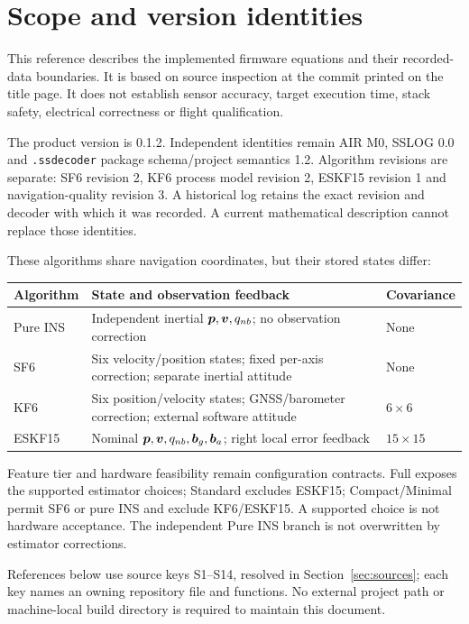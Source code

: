 \section{Scope and version identities}
This reference describes the implemented firmware equations and their recorded-data boundaries. It is based on source inspection at the commit printed on the title page. It does not establish sensor accuracy, target execution time, stack safety, electrical correctness or flight qualification.

The product version is 0.1.2. Independent identities remain AIR M0, SSLOG 0.0 and \texttt{.ssdecoder} package schema/project semantics 1.2. Algorithm revisions are separate: SF6 revision 2, KF6 process model revision 2, ESKF15 revision 1 and navigation-quality revision 3. A historical log retains the exact revision and decoder with which it was recorded. A current mathematical description cannot replace those identities.

These algorithms share navigation coordinates, but their stored states differ:
\begin{center}
\begin{tabular}{@{}L{22mm}L{71mm}L{30mm}@{}}
\toprule
Algorithm & State and observation feedback & Covariance \\
\midrule
Pure INS & Independent inertial $\boldsymbol{p},\boldsymbol{v},q_{nb}$; no observation correction & None \\
SF6 & Six velocity/position states; fixed per-axis correction; separate inertial attitude & None \\
KF6 & Six position/velocity states; GNSS/barometer correction; external software attitude & $6\times6$ \\
ESKF15 & Nominal $\boldsymbol{p},\boldsymbol{v},q_{nb},\boldsymbol{b}_g,\boldsymbol{b}_a$; right local error feedback & $15\times15$ \\
\bottomrule
\end{tabular}
\end{center}

Feature tier and hardware feasibility remain configuration contracts. Full exposes the supported estimator choices; Standard excludes ESKF15; Compact/Minimal permit SF6 or pure INS and exclude KF6/ESKF15. A supported choice is not hardware acceptance. The independent Pure INS branch is not overwritten by estimator corrections.

References below use source keys S1--S14, resolved in Section~\ref{sec:sources}; each key names an owning repository file and functions. No external project path or machine-local build directory is required to maintain this document.
